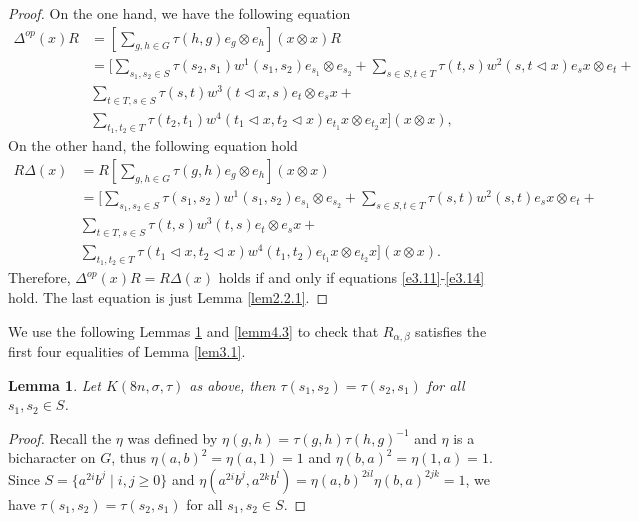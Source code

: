 \documentclass[a4paper,11pt]{amsart}
\numberwithin{equation}{section}
\newtheorem{lemma}[theorem]{Lemma}
\begin{document}
\begin{proof}
On the one hand, we have the following equation
\begin{align*}
\Delta^{op}(x)R&=[\sum\limits_{g,h \in G}\tau(h,g)e_g \otimes e_h](x \otimes x)R\\
                &=[\sum_{s_1,s_2 \in S}\tau(s_2,s_1)w^1(s_1,s_2)e_{s_1} \otimes e_{s_2}+ \sum_{s \in S, t \in T}\tau(t,s)w^2(s,t\triangleleft x)e_{s}x \otimes e_{t}+ \\
        &\sum_{t \in T, s \in S}\tau(s,t)w^3(t\triangleleft x,s)e_{t} \otimes e_{s}x+\\
        &\sum\limits_{t_1,t_2 \in T}\tau(t_2,t_1)w^4(t_1\triangleleft x,t_2 \triangleleft x)e_{t_1}x \otimes e_{t_2}x](x\otimes x),
\end{align*}
On the other hand, the following equation hold
\begin{align*}
R\Delta(x)&=R[\sum\limits_{g,h \in G}\tau(g,h)e_g \otimes e_h](x \otimes x)\\
                &=[\sum\limits_{s_1,s_2 \in S}\tau(s_1,s_2)w^1(s_1,s_2)e_{s_1} \otimes e_{s_2}+ \sum\limits_{s \in S, t \in T}\tau(s,t)w^2(s,t)e_{s}x \otimes e_{t}+\\
        &\sum\limits_{t \in T,  s \in S}\tau(t,s)w^3(t,s)e_{t} \otimes e_{s}x+\\
         &\sum\limits_{t_1,t_2 \in T}\tau(t_1\triangleleft x,t_2\triangleleft x)w^4(t_1,t_2)e_{t_1}x \otimes e_{t_2}x](x\otimes x).
\end{align*}
Therefore, $\Delta^{op}(x)R=R\Delta(x)$ holds if and only if equations \eqref{e3.11}-\eqref{e3.14} hold. The last equation is just Lemma \ref{lem2.2.1}.
\end{proof}

We use the following Lemmas \ref{lemm4.2} and \ref{lemm4.3} to check that $R_{\alpha,\beta}$ satisfies the first four equalities of Lemma \ref{lem3.1}.
\begin{lemma}\label{lemm4.2}
Let $K(8n,\sigma,\tau)$ as above, then $\tau(s_1,s_2)=\tau(s_2,s_1)$ for all $s_1,s_2\in S$.
\end{lemma}
\begin{proof}
Recall the $\eta$ was defined by $\eta(g,h)=\tau(g,h) \tau(h,g)^{-1}$ and $\eta$ is a bicharacter on $G$, thus $\eta(a,b)^2=\eta(a,1)=1$ and $\eta(b,a)^2=\eta(1,a)=1$. Since $S=\{a^{2i}b^j\;|\;i,j \geq 0\}$ and $\eta(a^{2i}b^j,a^{2k}b^l)=\eta(a,b)^{2il} \eta(b,a)^{2jk}=1$, we have $\tau(s_1,s_2)=\tau(s_2,s_1)$ for all $s_1,s_2\in S$.
\end{proof}
\end{document}

